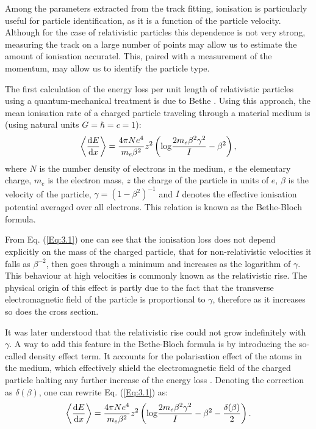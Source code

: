 Among the parameters extracted from the track fitting, ionisation is particularly useful for particle identification, as it is a function of the particle velocity. Although for the case of relativistic particles this dependence is not very strong, measuring the track on a large number of points may allow us to estimate the amount of ionisation accuratel. This, paired with a measurement of the momentum, may allow us to identify the particle type.

The first calculation of the energy loss per unit length of relativistic particles using a quantum-mechanical treatment is due to Bethe \cite{Bethe1930}. Using this approach, the mean ionisation rate of a charged particle traveling through a material medium is (using natural units $G=\hbar=c=1$):
\begin{equation}\label{Eq:3.1}
    \expval{\frac{\mathrm{d}E}{\mathrm{d}x}} = \frac{4 \pi N e^{4}}{m_{e}\beta^{2}} z^{2} \left(\mathrm{log} \frac{2m_{e}\beta^{2}\gamma^{2}}{I} - \beta^{2}\right),
\end{equation}
where $N$ is the number density of electrons in the medium, $e$ the elementary charge, $m_{e}$ is the electron mass, $z$ the charge of the particle in units of $e$, $\beta$ is the velocity of the particle, $\gamma = (1-\beta^{2})^{-1}$ and $I$ denotes the effective ionisation potential averaged over all electrons. This relation is known as the Bethe-Bloch formula.

From Eq. (\ref{Eq:3.1}) one can see that the ionisation loss does not depend explicitly on the mass of the charged particle, that for non-relativistic velocities it falls as $\beta^{-2}$, then goes through a minimum and increases as the logarithm of $\gamma$. This behaviour at high velocities is commonly known as the relativistic rise. The physical origin of this effect is partly due to the fact that the transverse electromagnetic field of the particle is proportional to $\gamma$, therefore as it increases so does the cross section.

It was later understood that the relativistic rise could not grow indefinitely with $\gamma$. A way to add this feature in the Bethe-Bloch formula is by introducing the so-called density effect term. It accounts for the polarisation effect of the atoms in the medium, which effectively shield the electromagnetic field of the charged particle halting any further increase of the energy loss \cite{Fermi1940}. Denoting the correction as $\delta(\beta)$, one can rewrite Eq. (\ref{Eq:3.1}) as:
\begin{equation}\label{Eq:3.2}
    \expval{\frac{\mathrm{d}E}{\mathrm{d}x}} = \frac{4 \pi N e^{4}}{m_{e}\beta^{2}} z^{2} \left(\mathrm{log} \frac{2m_{e}\beta^{2}\gamma^{2}}{I} - \beta^{2}-\frac{\delta(\beta)}{2}\right).
\end{equation}


